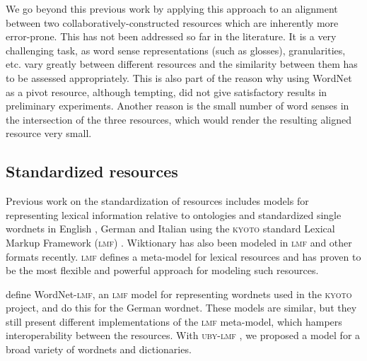 \documentclass[output=paper]{LSP/langsci}
\begin{document}
 We go beyond this previous work by applying this approach to an alignment between two collaboratively-constructed resources which are inherently more error-prone. This has not been addressed so far in the literature. It is a very challenging task, as word sense representations (such as glosses), granularities, etc. vary greatly between different resources and the similarity between them has to be assessed appropriately. This is also part of the reason why using WordNet as a pivot resource, although tempting, did not give satisfactory results in preliminary experiments. Another reason is the small number of word senses in the intersection of the three resources, which would render the resulting aligned resource very small.

\subsection{Standardized resources}

Previous work on the standardization of resources includes models for representing lexical information relative to ontologies \citep{Buitelaar09,McCrae11} and standardized single wordnets in English \citep{Soria09a}, German \citep{Henrich10a} and Italian \citep{Toral10} using the \textsc{kyoto} standard Lexical Markup Framework (\textsc{lmf}) \citep{Francopoulo2009}. Wiktionary has also been modeled in \textsc{lmf} \citep{Serasset12} and other formats \citep{DBLP:conf/lrec/DeclerckML12} recently. \textsc{lmf} defines a meta-model for lexical resources and has proven to be the most flexible and powerful approach for modeling such resources. 

\citet{Soria09a} define WordNet-\textsc{lmf}, an \textsc{lmf} model for representing wordnets used in the \textsc{kyoto} project, and \citet{Henrich10a} do this for the German wordnet. These models are similar, but they still present different implementations of the \textsc{lmf} meta-model, which hampers interoperability between the resources. With \textsc{uby-lmf} \citep{EckleKohler12}, we proposed a model for a broad variety of wordnets and dictionaries.
\end{document}
